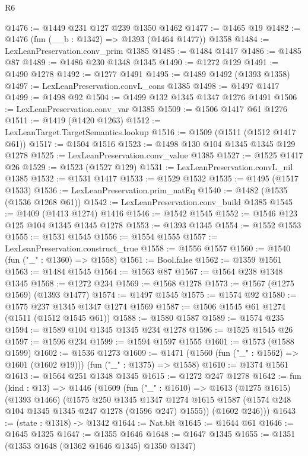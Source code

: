 \begin{lexlean}{R6}
\begin{coremodule}
@1476 := @1449 @231 @127 @239 @1350 @1462
@1477 := @1465 @19
@1482 := @1476 (fun (__b : @1342) => @1393 (@1464 @1477)) @1358
@1484 := LexLeanPreservation.conv_prim @1385
@1485 := @1484 @1417
@1486 := @1485 @87
@1489 := @1486 @230 @1348 @1345
@1490 := @1272 @129
@1491 := @1490 @1278
@1492 := @1277 @1491
@1495 := @1489 @1492 (@1393 @1358)
@1497 := LexLeanPreservation.convL_cons @1385
@1498 := @1497 @1417
@1499 := @1498 @92
@1504 := @1499 @132 @1345 @1347 @1276 @1491
@1506 := LexLeanPreservation.conv_var @1385
@1509 := @1506 @1417 @61 @1276
@1511 := @1419 (@1420 @1263)
@1512 := LexLeanTarget.TargetSemantics.lookup
@1516 := @1509 (@1511 (@1512 @1417 @61))
@1517 := @1504 @1516
@1523 := @1498 @130 @104 @1345 @1345 @129 @1278
@1525 := LexLeanPreservation.conv_value @1385
@1527 := @1525 @1417 @26
@1529 := @1523 (@1527 @129)
@1531 := LexLeanPreservation.convL_nil @1385
@1532 := @1531 @1417
@1533 := @1529 @1532
@1535 := @1495 (@1517 @1533)
@1536 := LexLeanPreservation.prim_natEq
@1540 := @1482 (@1535 (@1536 @1268 @61))
@1542 := LexLeanPreservation.conv_build @1385
@1545 := @1409 (@1413 @1274) @1416
@1546 := @1542 @1545
@1552 := @1546 @123 @125 @104 @1345 @1345 @1278
@1553 := @1393 @1345
@1554 := @1552 @1553
@1555 := @1531 @1545
@1556 := @1554 @1555
@1557 := LexLeanPreservation.construct_true
@1558 := @1556 @1557
@1560 := @1540 (fun ("_" : @1360) => @1558)
@1561 := Bool.false
@1562 := @1359 @1561
@1563 := @1484 @1545
@1564 := @1563 @87
@1567 := @1564 @238 @1348 @1345
@1568 := @1272 @234
@1569 := @1568 @1278
@1573 := @1567 (@1275 @1569) (@1393 @1477)
@1574 := @1497 @1545
@1575 := @1574 @92
@1580 := @1575 @237 @1345 @1347 @1274 @1569
@1587 := @1506 @1545 @61 @1274 (@1511 (@1512 @1545 @61))
@1588 := @1580 @1587
@1589 := @1574 @235
@1594 := @1589 @104 @1345 @1345 @234 @1278
@1596 := @1525 @1545 @26
@1597 := @1596 @234
@1599 := @1594 @1597 @1555
@1601 := @1573 (@1588 @1599)
@1602 := @1536 @1273
@1609 := @1471 (@1560 (fun ("_" : @1562) => @1601 (@1602 @19))) (fun ("_" : @1375) => @1558)
@1610 := @1374 @1561
@1613 := @1564 @251 @1348 @1345
@1615 := @1272 @247 @1278
@1642 := fun (kind : @13) =>
  @1446
    (@1609
      (fun ("_" : @1610) =>
      @1613
        (@1275 @1615)
        (@1393 @1466)
        (@1575
          @250
          @1345
          @1347
          @1274
          @1615
          @1587
          (@1574 @248 @104 @1345 @1345 @247 @1278 (@1596 @247) @1555))
        (@1602 @246)))
@1643 := (state : @1318) -> @1342
@1644 := Nat.blt
@1645 := @1644 @61
@1646 := @1645 @1325
@1647 := @1355 @1646
@1648 := @1647 @1345
@1655 := @1351 (@1353 @1648 (@1362 @1646 @1345) @1350 @1347)

\end{coremodule}
\end{lexlean}
